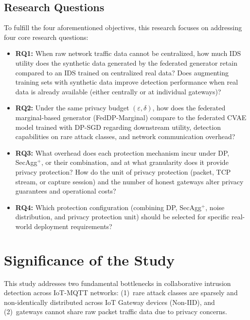 \subsection{Research Questions}
To fulfill the four aforementioned objectives, this research focuses on addressing four core research questions:
\begin{itemize}
    \item \textbf{RQ1:} When raw network traffic data cannot be centralized, how much IDS utility does the synthetic data generated by the federated generator retain compared to an IDS trained on centralized real data? Does augmenting training sets with synthetic data improve detection performance when real data is already available (either centrally or at individual gateways)?
    \item \textbf{RQ2:} Under the same privacy budget $(\varepsilon, \delta)$, how does the federated marginal-based generator (FedDP-Marginal) compare to the federated CVAE model trained with DP-SGD regarding downstream utility, detection capabilities on rare attack classes, and network communication overhead?
    \item \textbf{RQ3:} What overhead does each protection mechanism incur under DP, SecAgg$^+$, or their combination, and at what granularity does it provide privacy protection? How do the unit of privacy protection (packet, TCP stream, or capture session) and the number of honest gateways alter privacy guarantees and operational costs?
    \item \textbf{RQ4:} Which protection configuration (combining DP, SecAgg$^+$, noise distribution, and privacy protection unit) should be selected for specific real-world deployment requirements?
\end{itemize}
\clearpage
\section{Significance of the Study}
This study addresses two fundamental bottlenecks in collaborative intrusion detection across IoT-MQTT networks: (1)~rare attack classes are sparsely and non-identically distributed across IoT Gateway devices (Non-IID), and (2)~gateways cannot share raw packet traffic data due to privacy concerns.

